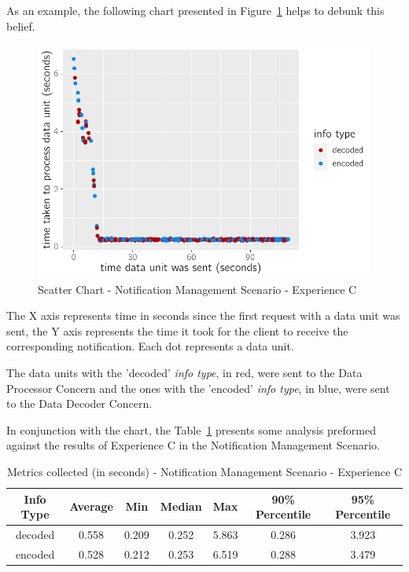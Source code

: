 As an example, the following chart presented in Figure~\ref{fig:evaluation:overview:decoproc:chart:s3eC} helps to debunk this belief.

\begin{figure}[H]
    \centering
    \includegraphics[page=1]{assets/charts/s3eC.pdf}
    \caption[Scatter Chart - Notification Management Scenario - Experience C]{Scatter Chart - Notification Management Scenario - Experience C}
    \label{fig:evaluation:overview:decoproc:chart:s3eC}
\end{figure}

The X axis represents time in seconds since the first request with a data unit was sent, the Y axis represents the time it took for the client to receive the corresponding notification. Each dot represents a data unit.

The data units with the 'decoded' \textit{info type}, in red, were sent to the Data Processor Concern and the ones with the 'encoded' \textit{info type}, in blue, were sent to the Data Decoder Concern.

In conjunction with the chart, the Table~\ref{tab:evaluation:overview:decoproc:results} presents some analysis preformed against the results of Experience C in the Notification Management Scenario.

\begin{table}[H]
    \caption{Metrics collected (in seconds) - Notification Management Scenario - Experience C}
    \label{tab:evaluation:overview:decoproc:results}
    \centering
    \begin{tabular}{@{}ccccccc@{}}
    \toprule
    \textbf{Info Type} & \textbf{Average} & \textbf{Min} & \textbf{Median} & \textbf{Max} & \textbf{90\% Percentile} & \textbf{95\% Percentile} \\ \midrule
    decoded & 0.558 & 0.209 & 0.252 & 5.863 & 0.286 & 3.923 \\ \midrule
    encoded & 0.528 & 0.212 & 0.253 & 6.519 & 0.288 & 3.479 \\ \bottomrule
    \end{tabular}
\end{table}

